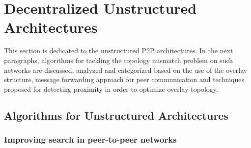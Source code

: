 \section{Decentralized Unstructured Architectures}
\label{section:unstructured}

This section is dedicated to the unstructured P2P architectures. In the next
paragraphs, algorithms for tackling the topology mismatch problem on such
networks are discussed, analyzed and categorized based on the use of the
overlay structure, message forwarding approach for peer communication and
techniques proposed for detecting proximity in order to optimize overlay
topology.


%
%
%


\subsection{Algorithms for Unstructured Architectures}


\subsubsection{Improving search in peer-to-peer networks}

